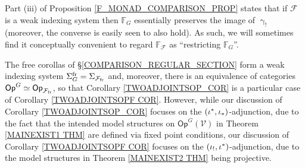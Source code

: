 \documentclass[a4paper,10pt]{article}%
\begin{document}
\begin{remark}\label{WINDEX_GAMMA_REM}
Part (iii) of Proposition \ref{F_MONAD_COMPARISON_PROP}
states that if $\mathcal{F}$ is a weak indexing system then $\mathbb{F}_G$ essentially preserves the image of $\upgamma_!$ (moreover, the converse is easily seen to also hold).
As such, we will sometimes find it conceptually convenient
to regard $\mathbb{F}_{\mathcal{F}}$ as
``restricting $\mathbb{F}_G$''.
\end{remark}

%
        
\begin{remark}        
	The free corollas of \S	\ref{COMPARISON_REGULAR_SECTION}
	form a weak indexing system
	$\Sigma_G^{\text{fr}} = \Sigma_{\mathcal F_{\text{fr}}}$
	and, moreover, there is an equivalence of categories
	$\mathsf{Op}^G \simeq \mathsf{Op}_{\mathcal F_{\text{fr}}}$,
	so that Corollary \ref{TWOADJOINTSOP_COR}
	is a particular case of 
	Corollary \ref{TWOADJOINTSOPF COR}.
	However, while our discussion of 
	Corollary \ref{TWOADJOINTSOP_COR}
	focuses on the $(\iota^{\**},\iota_{\**})$-adjunction, due to the fact that the intended model structures on $\mathsf{Op}^G(\mathcal{V})$ in
	Theorem \ref{MAINEXIST1 THM} are defined via fixed point conditions, 
	our discussion of 
	Corollary \ref{TWOADJOINTSOPF COR}
	focuses on the $(\iota_{!},\iota^{\**})$-adjunction, due to the model structures in 
	Theorem \ref{MAINEXIST2 THM} being projective.
\end{remark}
\end{document}
